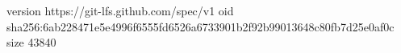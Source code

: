 version https://git-lfs.github.com/spec/v1
oid sha256:6ab228471e5e4996f6555fd6526a6733901b2f92b99013648c80fb7d25e0af0c
size 43840

